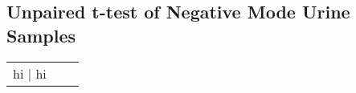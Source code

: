 \subsection{Unpaired t-test of Negative Mode Urine Samples}
\begin{tabular}{c|c|c}
	hi | hi
\end{tabular}